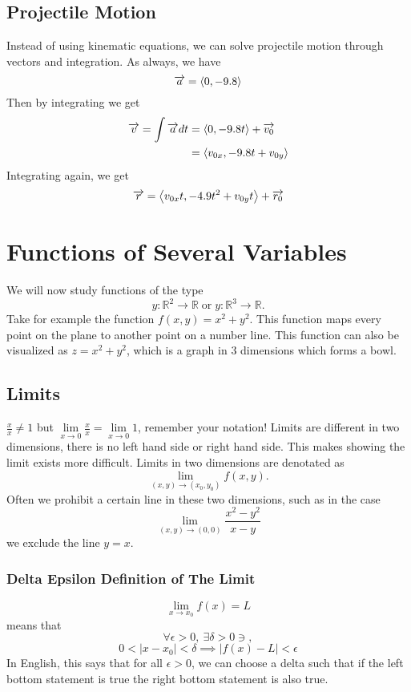 \documentclass[12pt]{article}
\theoremstyle{plain} %
\theoremstyle{definition}
\theoremstyle{definition}
\theoremstyle{definition}
\theoremstyle{remark}
\newcommand{\vecr}{\vv{r}}
\newcommand{\angled}[1]{\left\langle {#1} \right\rangle}
\renewcommand\abs[1]{\left| #1 \right|}
\newcommand*{\vv}[1]{\overrightarrow{\mkern0mu#1}}
\begin{document}
\subsection{Projectile Motion}
Instead of using kinematic equations, we can solve projectile motion through vectors and integration. As always, we have
\[ \vv{a} = \angled{0,-9.8} \]
Then by integrating we get
\begin{align*}
    \vv{v} = \int{\vv{a}dt} &= \angled{0,-9.8t}+\vv{v_0} \\
    & = \angled{v_{0x},-9.8t + v_{0y}}
\end{align*}
Integrating again, we get
\[ \vecr = \angled{v_{0x}t,-4.9t^2 + v_{0y}t} + \vv{r_0} \]

\section{Functions of Several Variables}
We will now study functions of the type
\[ y:\mathbb{R}^2 \rightarrow \mathbb{R} \; \text{or} \; y:\mathbb{R}^3 \rightarrow \mathbb{R} .\]
Take for example the function $f(x,y) = x^2 + y^2$. This function maps every point on the plane to another point on a number line. This function can also be visualized as $z=x^2+y^2$, which is a graph in $3$ dimensions which forms a bowl.
\subsection{Limits}
$\frac{x}{x} \neq 1$ but $\lim\limits_{x\rightarrow0} \frac{x}{x} = \lim\limits_{x\rightarrow0} 1$, remember your notation!
Limits are different in two dimensions, there is no left hand side or right hand side. This makes showing the limit exists more difficult. Limits in two dimensions are denotated as
\[ \lim_{(x,y)\to(x_0,y_0)} f(x,y) .\]
Often we prohibit a certain line in these two dimensions, such as in the case
\[ \lim_{(x,y)\to(0,0)} \frac{x^2-y^2}{x-y} \]
we exclude the line $y=x$.
\subsubsection{Delta Epsilon Definition of The Limit}
\[
    \lim_{x\to x_0}f(x) = L \] means that
\[ \forall \epsilon > 0,  \ \exists  \delta > 0 \ni ,\]
\[ 0 < \abs{x-x_0} < \delta \implies \abs{f(x)-L} < \epsilon \]
In English, this says that for all $\epsilon > 0$, we can choose a delta such that if the left bottom statement is true the right bottom statement is also true.
\end{document}
